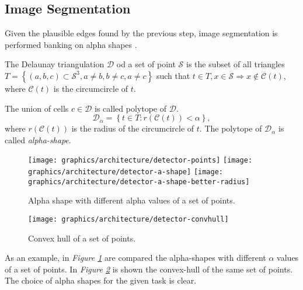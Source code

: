     \subsection{Image Segmentation}\label{subsection:segmentation}
        \par{
            Given the plausible edges found by the previous step, image segmentation is performed banking on alpha shapes \cite{springer:10.1007/11907350_46}.
        }
        \par{
            The Delaunay triangulation $\mathcal{D}$ od a set of point $\mathcal{S}$ is the subset of all triangles $T = \left\{\left(a, b, c\right) \subset \mathcal{S}^3, a \neq b, b \neq c, a \neq c \right\}$ such that $t \in T, x \in \mathcal{S} \Rightarrow x \not\in \mathcal{C}\left(t\right)$, where $\mathcal{C}\left(t\right)$ is the circumcircle of $t$.
        }
        \par{
            The union of cells $c \in \mathcal{D}$ is called polytope of $\mathcal{D}$. 
            \begin{equation*}
                \mathcal{D}_\alpha = \left\{t \in T \colon r\left(\mathcal{C}\left(t\right)\right) < \alpha\right\},
            \end{equation*}
            where $r\left(\mathcal{C}\left(t\right)\right)$ is the radius of the circumcircle of $t$. The polytope of $\mathcal{D}_\alpha$ is called \emph{alpha-shape}.
        }
        \begin{figure}
            \centering
            \texttt{[image: graphics/architecture/detector-points]}
            \texttt{[image: graphics/architecture/detector-a-shape]}
            \texttt{[image: graphics/architecture/detector-a-shape-better-radius]}
            \caption{Alpha shape with different alpha values of a set of points.}\label{fig:example-alpha-shape}
        \end{figure}
        \begin{figure}
            \centering
            \texttt{[image: graphics/architecture/detector-convhull]}
            \caption{Convex hull of a set of points.}\label{fig:example-convex-hull}
        \end{figure}
        \par{
            As an example, in \emph{Figure \ref{fig:example-alpha-shape}} are compared the alpha-shapes with different $\alpha$ values of a set of points. In \emph{Figure \ref{fig:example-convex-hull}} is shown the convex-hull of the same set of points. The choice of alpha shapes for the given task is clear.
        }
